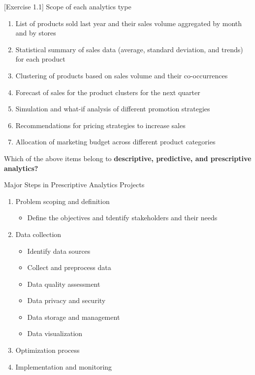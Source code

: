 \documentclass [xcolor=svgnames, handout]{beamer}
\begin{document}
\begin{frame}{[Exercise 1.1] Scope of each analytics type}

    \begin{enumerate}[<.->]
        \item List of products sold last year and their sales volume aggregated by month and by stores 
		\item Statistical summary of sales data (average, standard deviation, and trends) for each product
		\item Clustering of products based on sales volume and their co-occurrences
		\item Forecast of sales for the product clusters for the next quarter
		\item Simulation and what-if analysis of different promotion strategies
		\item Recommendations for pricing strategies to increase sales
		\item Allocation of marketing budget across different product categories
    \end{enumerate}

  
    Which of the above items belong to \textbf{descriptive, predictive, and prescriptive analytics?}

\end{frame}

\begin{frame}{Major Steps in Prescriptive Analytics Projects}

    \begin{enumerate}[<+->]
        \item Problem scoping and definition
        \begin{itemize}[<.->]
            \item Define the objectives and tdentify stakeholders and their needs
        \end{itemize}
        \item Data collection
        \begin{itemize}[<.->]
            \item Identify data sources
            \item Collect and preprocess data
            \item Data quality assessment
            \item Data privacy and security
            \item Data storage and management
            \item Data visualization
        \end{itemize}
        \item Optimization process 
        \item Implementation and monitoring
    \end{enumerate}
\end{frame}
\end{document}
